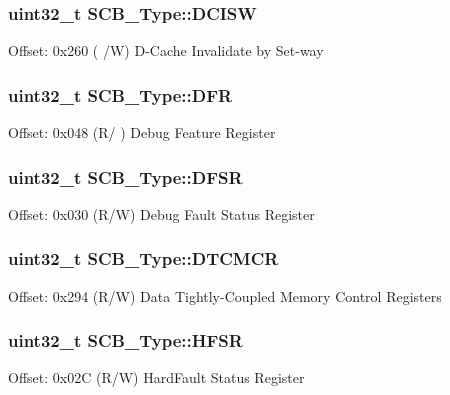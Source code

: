 \subsubsection[{\texorpdfstring{D\+C\+I\+SW}{DCISW}}]{ uint32\+\_\+t S\+C\+B\+\_\+\+Type\+::\+D\+C\+I\+SW}\hypertarget{structSCB__Type_a50230b7ffe2728d6fb9e317a15978ab3}{}\label{structSCB__Type_a50230b7ffe2728d6fb9e317a15978ab3}
Offset\+: 0x260 ( /W) D-\/\+Cache Invalidate by Set-\/way 
\subsubsection[{\texorpdfstring{D\+FR}{DFR}}]{ uint32\+\_\+t S\+C\+B\+\_\+\+Type\+::\+D\+FR}\hypertarget{structSCB__Type_a586a5225467262b378c0f231ccc77f86}{}\label{structSCB__Type_a586a5225467262b378c0f231ccc77f86}
Offset\+: 0x048 (R/ ) Debug Feature Register 
\subsubsection[{\texorpdfstring{D\+F\+SR}{DFSR}}]{ uint32\+\_\+t S\+C\+B\+\_\+\+Type\+::\+D\+F\+SR}\hypertarget{structSCB__Type_ad7d61d9525fa9162579c3da0b87bff8d}{}\label{structSCB__Type_ad7d61d9525fa9162579c3da0b87bff8d}
Offset\+: 0x030 (R/W) Debug Fault Status Register 
\subsubsection[{\texorpdfstring{D\+T\+C\+M\+CR}{DTCMCR}}]{ uint32\+\_\+t S\+C\+B\+\_\+\+Type\+::\+D\+T\+C\+M\+CR}\hypertarget{structSCB__Type_a1728cb36883856a3543286d9acfb8a0d}{}\label{structSCB__Type_a1728cb36883856a3543286d9acfb8a0d}
Offset\+: 0x294 (R/W) Data Tightly-\/\+Coupled Memory Control Registers 
\subsubsection[{\texorpdfstring{H\+F\+SR}{HFSR}}]{ uint32\+\_\+t S\+C\+B\+\_\+\+Type\+::\+H\+F\+SR}\hypertarget{structSCB__Type_a7bed53391da4f66d8a2a236a839d4c3d}{}\label{structSCB__Type_a7bed53391da4f66d8a2a236a839d4c3d}
Offset\+: 0x02C (R/W) Hard\+Fault Status Register 
